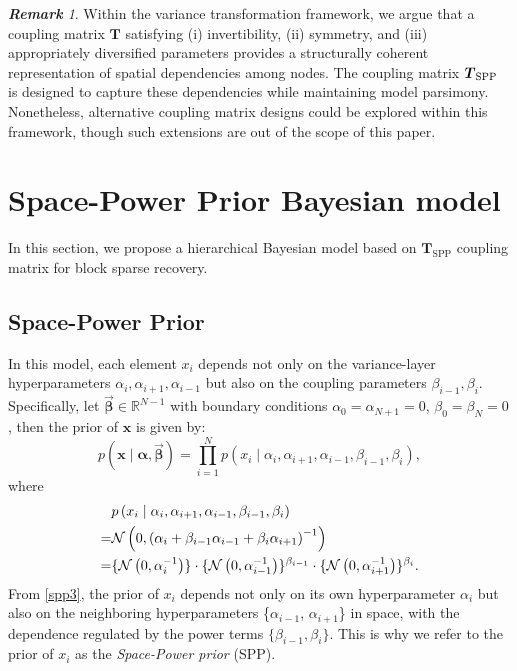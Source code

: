 \documentclass[lettersize,journal]{IEEEtran}
\theoremstyle{remark}
\newtheorem{remark}{\textbf{Remark}}
\begin{document}
\begin{remark}
	 Within the variance transformation framework, we argue that a coupling matrix \( \boldsymbol{T} \) satisfying (i) invertibility, (ii) symmetry, and (iii) appropriately diversified parameters provides a structurally coherent representation of spatial dependencies among nodes. The coupling matrix $\boldsymbol{T}_{\rm SPP}$ is designed to capture these dependencies while maintaining model parsimony. Nonetheless, alternative coupling matrix designs could be explored within this framework, though such extensions are out of the scope of this paper.
\end{remark}


\section{Space-Power Prior Bayesian model}\label{SPP model}

In this section, we propose a hierarchical Bayesian model based on \( \boldsymbol{T}_{\text{SPP}} \) coupling matrix for block sparse recovery. 

\subsection{Space-Power Prior}
In this model, each element \( x_i \) depends not only on the variance-layer hyperparameters \( \alpha_i, \alpha_{i+1}, \alpha_{i-1} \) but also on the coupling parameters \( \beta_{i-1}, \beta_i \). Specifically, let \( \vec{\boldsymbol{\beta}} \in \mathbb{R}^{N-1} \) with boundary conditions \( \alpha_0 = \alpha_{N+1} = 0 \), \( \beta_0 = \beta_N = 0 \),  then the prior of \( \mathbf{x} \) is given by:
\begin{equation}
	p(\mathbf{x} \mid \boldsymbol{\alpha},\vec{\boldsymbol{\beta}})=\prod_{i=1}^N p\left(x_i \mid \alpha_i, \alpha_{i+1}, \alpha_{i-1}, \beta_{i-1}, \beta_{i}\right),\label{spp1}
\end{equation}
where 
\begin{align}
	&p\left(x_i \mid \alpha_i, \alpha_{i+1}, \alpha_{i-1}, \beta_{i-1}, \beta_{i}\right) \notag\\
	=&\mathcal{N}\left(  0,\left(\alpha_i+\beta_{i-1} \alpha_{i-1}+\beta_i \alpha_{i+1}\right)^{-1}\right)\label{spp2}\\
	=&\{\mathcal{N}\left(0, \alpha_i^{-1}\right)\} \cdot\{\mathcal{N}\left(0, \alpha_{i-1}^{-1}\right)\}^{\beta_{i-1}} \cdot\{\mathcal{N}\left(0, \alpha_{i+1}^{-1}\right)\}^{\beta_{i}}.\label{spp3}
\end{align}
From \eqref{spp3}, the prior of \( x_i \) depends not only on its own hyperparameter \( \alpha_i \) but also on the neighboring hyperparameters \{\( \alpha_{i-1} \), \( \alpha_{i+1} \)\} in space, with the dependence regulated by the power terms \( \{\beta_{i-1}, \beta_{i}\} \). This is why we refer to the prior of \( x_i \) as the \textit{Space-Power prior} (SPP).  
\end{document}

